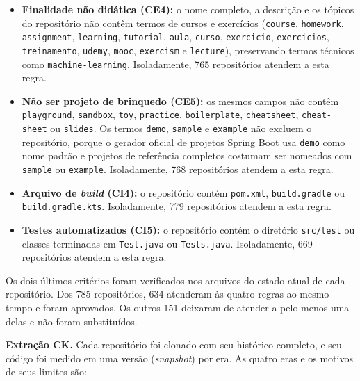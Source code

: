 \begin{itemize}
    \item \textbf{Finalidade não didática (CE4):} o nome completo, a descrição e os tópicos do repositório não contêm termos de cursos e exercícios (\texttt{course}, \texttt{homework}, \texttt{assignment}, \texttt{learning}, \texttt{tutorial}, \texttt{aula}, \texttt{curso}, \texttt{exercicio}, \texttt{exercicios}, \texttt{treinamento}, \texttt{udemy}, \texttt{mooc}, \texttt{exercism} e \texttt{lecture}), preservando termos técnicos como \texttt{machine-learning}. Isoladamente, 765 repositórios atendem a esta regra.
    \item \textbf{Não ser projeto de brinquedo (CE5):} os mesmos campos não contêm \texttt{playground}, \texttt{sandbox}, \texttt{toy}, \texttt{practice}, \texttt{boilerplate}, \texttt{cheatsheet}, \texttt{cheat-sheet} ou \texttt{slides}. Os termos \texttt{demo}, \texttt{sample} e \texttt{example} não excluem o repositório, porque o gerador oficial de projetos Spring Boot usa \texttt{demo} como nome padrão e projetos de referência completos costumam ser nomeados com \texttt{sample} ou \texttt{example}. Isoladamente, 768 repositórios atendem a esta regra.
    \item \textbf{Arquivo de \emph{build} (CI4):} o repositório contém \texttt{pom.xml}, \texttt{build.gradle} ou \texttt{build.gradle.kts}. Isoladamente, 779 repositórios atendem a esta regra.
    \item \textbf{Testes automatizados (CI5):} o repositório contém o diretório \texttt{src/test} ou classes terminadas em \texttt{Test.java} ou \texttt{Tests.java}. Isoladamente, 669 repositórios atendem a esta regra.
\end{itemize}

Os dois últimos critérios foram verificados nos arquivos do estado atual de cada repositório. Dos 785 repositórios, 634 atenderam às quatro regras ao mesmo tempo e foram aprovados. Os outros 151 deixaram de atender a pelo menos uma delas e não foram substituídos.

\textbf{Extração CK.} Cada repositório foi clonado com seu histórico completo, e seu código foi medido em uma versão (\emph{snapshot}) por era. As quatro eras e os motivos de seus limites são:

